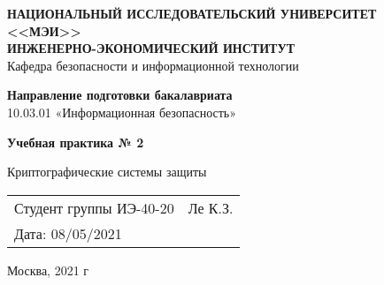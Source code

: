 \begin{titlepage}
   \begin{center}
    \textbf{НАЦИОНАЛЬНЫЙ ИССЛЕДОВАТЕЛЬСКИЙ УНИВЕРСИТЕТ <<МЭИ>>}\\
    \textbf{ИНЖЕНЕРНО-ЭКОНОМИЧЕСКИЙ ИНСТИТУТ}\\
    \vspace{0.5cm}
    Кафедра безопасности и информационной технологии
    \end{center}
    
    \vspace*{3cm}
    
    \begin{flushright}
       \textbf{Направление подготовки бакалавриата} \\
       10.03.01 «Информационная безопасность»
    \end{flushright}
    
    \vspace*{3.5cm}
    
    \begin{center}
       \textbf{Учебная практика № 2}

       \vspace{0.5cm}
        Криптографические системы защиты
    \vspace{3.5cm}
    \end{center}
        \begin{center}
            \begin{tabularx}{0.8\textwidth}{
            >{\raggedright\arraybackslash}X
            >{\raggedleft\arraybackslash}X }
                Студент группы ИЭ-40-20 &  Ле К.З.\\
                Дата: 08/05/2021 &
            \end{tabularx}
        \end{center}
        \vfill
        \vspace{0.8cm}
        \centering
        Москва, 2021 г
\end{titlepage}